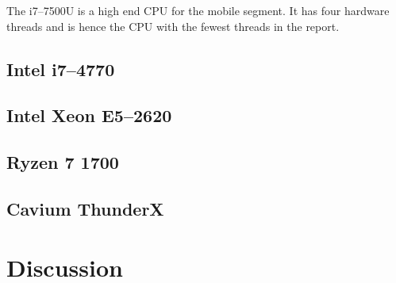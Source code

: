 \documentclass[b5paper]{report}
\begin{document}
The i7--7500U is a high end CPU for the mobile segment. It has four hardware
threads and is hence the CPU with the fewest threads in the report.


\clearpage
\section{Intel\textregistered{} i7--4770}

\clearpage
\section{Intel\textregistered{} Xeon\textregistered{} E5--2620}

\clearpage
\section{Ryzen 7 1700}

\clearpage
\section{Cavium ThunderX}


\chapter{Discussion\label{ch:discussion}}




\end{document}

